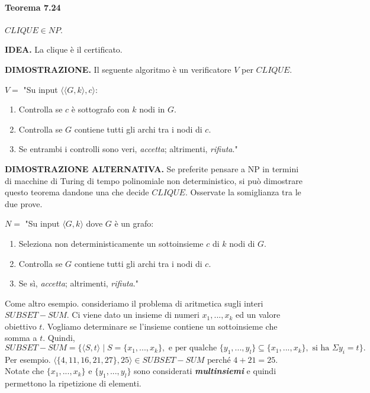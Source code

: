 \documentclass{article}
\begin{document}
\paragraph{Teorema 7.24}
\label{teorema-7.24}

\text{}
\newline
$CLIQUE \in NP$.

\text{}
\newline
\textbf{IDEA.} La clique è il certificato.

\text{}
\newline
\textbf{DIMOSTRAZIONE.} Il seguente algoritmo è un verificatore $V$ per $CLIQUE$.

\text{}
\newline
$V =$ "Su input $\langle \langle G, k \rangle, c \rangle$:
\begin{enumerate}
    \item Controlla se $c$ è sottografo con $k$ nodi in $G$.
    \item Controlla se $G$ contiene tutti gli archi tra i nodi di $c$.
    \item Se entrambi i controlli sono veri, \textit{accetta}; altrimenti, \textit{rifiuta}."
\end{enumerate}
\vspace{1em}
\text{}
\newline
\textbf{DIMOSTRAZIONE ALTERNATIVA.}
Se preferite pensare a NP in termini di macchine di Turing di tempo polinomiale non deterministico, si può dimostrare questo teorema dandone una che decide $CLIQUE$. 
Osservate la somiglianza tra le due prove.

\text{}
\newline
$N =$ "Su input $\langle G, k \rangle$ dove $G$ è un grafo:
\begin{enumerate}
    \item Seleziona non deterministicamente un sottoinsieme $c$ di $k$ nodi di $G$.
    \item Controlla se $G$ contiene tutti gli archi tra i nodi di $c$.
    \item Se sì, \textit{accetta}; altrimenti, \textit{rifiuta}."
\end{enumerate}

\text{}
\newline
Come altro esempio. consideriamo il problema di aritmetica sugli interi $SUBSET-SUM$. 
Ci viene dato un insieme di numeri $x_1,...,x_k$ ed un valore obiettivo $t$.
Vogliamo determinare se l'insieme contiene un sottoinsieme che somma a $t$. Quindi,
$$
SUBSET-SUM = \{ \langle S, t \rangle \mid S = \{x_1,...,x_k\}, \text{ e per qualche } \{y_1,...,y_l\} \subseteq \{x_1,...,x_k\}, \text{ si ha } \Sigma y_i = t \}.
$$
Per esempio. $\langle \{4, 11, 16, 21, 27\}, 25 \rangle \in SUBSET-SUM \text{ perché } 4 + 21 = 25$. 
Notate che $\{x_1,...,x_k\} \text{ e } \{y_1,...,y_l\}$ sono considerati \textbf{\textit{multinsiemi}} e quindi permettono la ripetizione di elementi.
\end{document}

